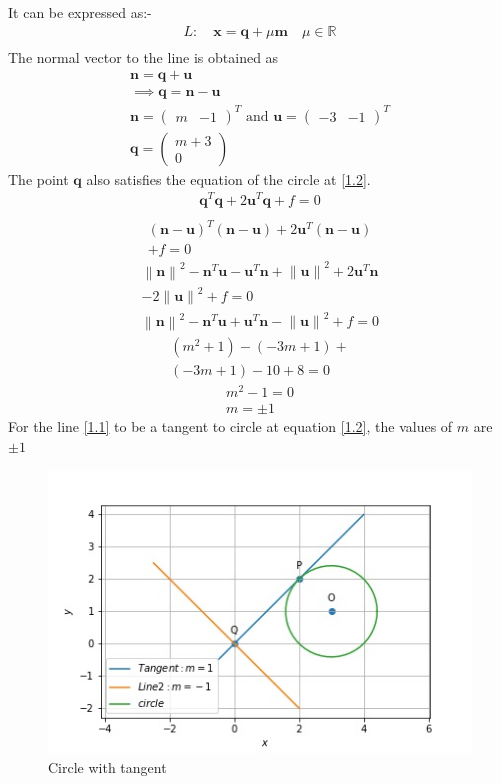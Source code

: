 \documentclass[journal,12pt,twocolumn]{IEEEtran}
\let\vec\mathbf
\numberwithin{equation}{subsection}
\newcommand{\myvec}[1]{\ensuremath{\begin{pmatrix}#1\end{pmatrix}}}
\newcommand{\norm}[1]{\left\lVert#1\right\rVert}
\begin{document}
It can be expressed as:-
\begin{align}
L: \quad \vec{x} = \vec{q} + \mu \vec{m} \quad \mu \in \mathbb{R} \label{2.10} \\
\end{align}
The normal vector to the line is obtained as
\begin{align}
\vec{n} = \vec{q} + \vec{u}\\
\implies \vec{q}  = \vec{n} -  \vec{u}\\
\vec{n} =\myvec{m & -1 }^T  \text{ and } \vec{u} =\myvec{-3 & -1}^T\\
\vec{q} = \myvec{m+3 \\ 0}
\end{align}
The point $\vec{q}$ also satisfies the equation of the circle at \ref{1.2}.
\begin{align}
\vec{q}^T\vec{q}+ 2\vec{u}^T\vec{q} + f = 0 \\
\end{align}
\begin{multline}
(\vec{n} -\vec{ u})^T(\vec{n} -\vec{ u})+2\vec{u}^T(\vec{n} -\vec{ u})\\+f = 0
\end{multline}
\begin{multline}
\norm{\vec{n}}^2 - \vec{n}^T \vec{u} - \vec{u}^T\vec{n} + \norm{\vec{u}}^2  + 2\vec{u}^T\vec{n}\\ -2 \norm{\vec{u}}^2 +f = 0 
\end{multline}
\begin{multline}
\norm{\vec{n}}^2 - \vec{n}^T \vec{u} +\vec{u}^T\vec{n} - \norm{\vec{u}}^2  +f = 0 
\end{multline}
\begin{multline}
(m^2 +1) - (-3m + 1) +\\(-3m + 1) - 10 +8 = 0 
\end{multline}
\begin{align}
m^2 -1 =0\\
m=\pm 1
\end{align}
For the line \ref{1.1} to be a tangent to circle at equation \ref{1.2}, the values of $m$ are $\pm1$
\begin{figure}[!]
\includegraphics[width=1\columnwidth]{CircleTangent.jpg}
\caption{Circle with tangent}
\end{figure}
\end{document}
